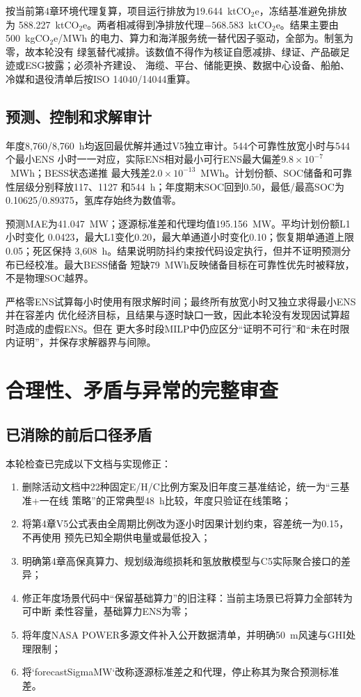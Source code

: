 按当前第4章环境代理复算，项目运行排放为19.644~ktCO$_2$e，冻结基准避免排放为
588.227~ktCO$_2$e。两者相减得到净排放代理$-568.583$~ktCO$_2$e。结果主要由
500~kgCO$_2$e/MWh
的电力、算力和海洋服务统一替代因子驱动，全部为\assumptiontag。制氢为零，故本轮没有
绿氢替代减排。该数值不得作为核证自愿减排、绿证、产品碳足迹或ESG披露；必须补齐建设、
海缆、平台、储能更换、数据中心设备、船舶、冷媒和退役清单后按ISO 14040/14044重算。

\subsection{预测、控制和求解审计}

年度8,760/8,760~h均返回最优解并通过V5独立审计。544个可靠性放宽小时与544个最小ENS
小时一一对应，实际ENS相对最小可行ENS最大偏差$9.8\times10^{-7}$~MWh；BESS状态递推
最大残差$2.0\times10^{-13}$~MWh。计划份额、SOC储备和可靠性层级分别释放117、1127
和544~h；年度期末SOC回到0.50，最低/最高SOC为0.10625/0.89375，氢库存始终为数值零。

预测MAE为41.047~MW；逐源标准差和代理均值195.156~MW。平均计划份额L1小时变化
0.0423，最大L1变化0.20，最大单通道小时变化0.10；恢复期单通道上限0.05；死区保持
3,608~h。结果说明防抖约束按代码设定执行，但并不证明预测分布已经校准。最大BESS储备
短缺79~MWh反映储备目标在可靠性优先时被释放，不是物理SOC越界。

严格零ENS试算每小时使用有限求解时间；最终所有放宽小时又独立求得最小ENS并在容差内
优化经济目标，且结果与逐时缺口一致，因此本轮没有发现因试算超时造成的虚假ENS。但在
更大多时段MILP中仍应区分“证明不可行”和“未在时限内证明”，并保存求解器界与间隙。

\section{合理性、矛盾与异常的完整审查}

\subsection{已消除的前后口径矛盾}

本轮检查已完成以下文档与实现修正：
\begin{enumerate}[label=(\arabic*)]
\item 删除活动文档中22种固定E/H/C比例方案及旧年度三基准结论，统一为“三基准+一在线
      策略”的正常典型48~h比较，年度只验证在线策略；
\item 将第4章V5公式表由全周期比例改为逐小时因果计划约束，容差统一为0.15，不再使用
      预先已知全期供电量或最低投入；
\item 明确第4章高保真算力、规划级海缆损耗和氢放散模型与C5实际聚合接口的差异；
\item 修正年度场景代码中“保留基础算力”的旧注释：当前主场景已将算力全部转为可中断
      柔性容量，基础算力ENS为零；
\item 将年度NASA POWER多源文件补入公开数据清单，并明确50~m风速与GHI处理限制；
\item 将`forecastSigmaMW`改称逐源标准差之和代理，停止称其为聚合预测标准差。
\end{enumerate}

